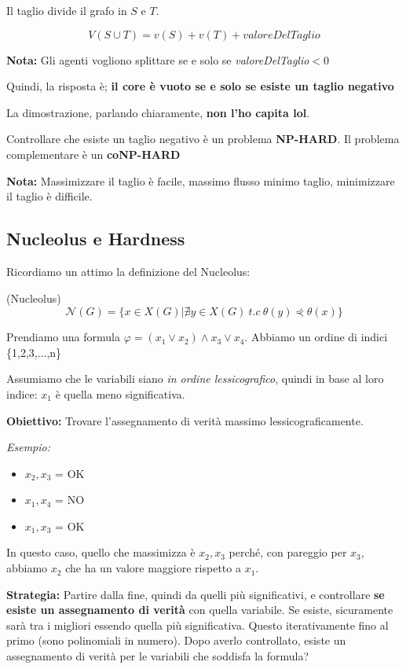 Il taglio divide il grafo in $S$ e $T$.

\[
    V(S \cup T) = v(S) + v(T) + valoreDelTaglio
\]

\textbf{Nota:} Gli agenti vogliono splittare se e solo se  \textit{valoreDelTaglio}$<$0

Quindi, la risposta è; \textbf{il core è vuoto se e solo se esiste un taglio
    negativo}

La dimostrazione, parlando chiaramente, \textbf{non l'ho capita lol}.

Controllare che esiste un taglio negativo è un problema \textbf{NP-HARD}. Il
problema complementare è un \textbf{coNP-HARD}

\textbf{Nota:} Massimizzare il taglio è facile, massimo flusso minimo taglio, minimizzare il taglio è difficile.

\subsection{Nucleolus e Hardness}

Ricordiamo un attimo la definizione del Nucleolus:

\begin{definition}(Nucleolus)
    \[
        \mathcal{N}(G) = \{x \in X(G) | \nexists y \in X(G) \ t.c \ \theta(y) \curlyeqprec \theta(x)\}
    \]
\end{definition}

Prendiamo una formula $\varphi = (x_1 \lor x_2) \land x_3 \lor x_4$. Abbiamo un
ordine di indici \{1,2,3,$\dots$,n\}

Assumiamo che le variabili siano \textit{in ordine lessicografico}, quindi in
base al loro indice: $x_1$ è quella meno significativa.

\textbf{Obiettivo:} Trovare l'assegnamento di verità massimo lessicograficamente.

\textit{Esempio:}

\begin{itemize}
    \item $x_2, x_3$ = OK
    \item $x_1, x_4$ = NO
    \item $x_1, x_3$ = OK
\end{itemize}

In questo caso, quello che massimizza è $x_2, x_3$ perché, con pareggio per
$x_3$, abbiamo $x_2$ che ha un valore maggiore rispetto a $x_1$.

\textbf{Strategia:} Partire dalla fine, quindi da quelli più significativi, e controllare \textbf{se esiste un assegnamento di verità} con quella variabile. Se esiste, sicuramente sarà tra i migliori essendo quella più significativa. Questo iterativamente fino al primo (sono polinomiali in numero). Dopo averlo controllato,
esiste un assegnamento di verità per le variabili che soddisfa la formula?

